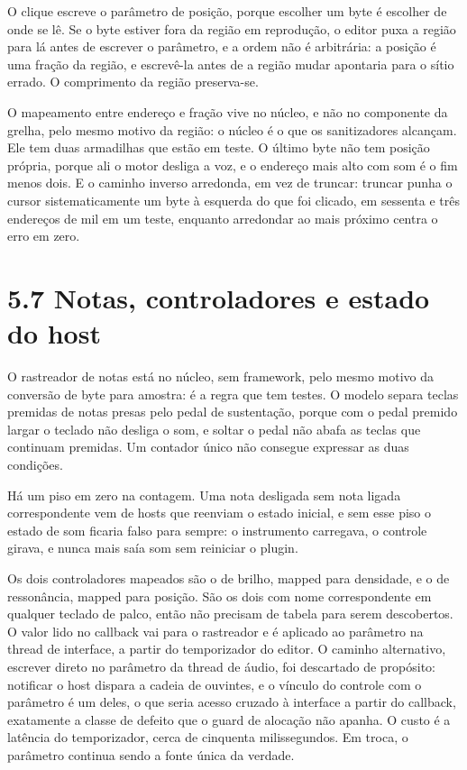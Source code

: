 \documentclass[12pt,a4paper]{article}
\begin{document}
O clique escreve o parâmetro de posição, porque escolher um byte é escolher de onde se lê. Se o byte estiver fora da região em reprodução, o editor puxa a região para lá antes de escrever o parâmetro, e a ordem não é arbitrária: a posição é uma fração da região, e escrevê-la antes de a região mudar apontaria para o sítio errado. O comprimento da região preserva-se.


O mapeamento entre endereço e fração vive no núcleo, e não no componente da grelha, pelo mesmo motivo da região: o núcleo é o que os sanitizadores alcançam. Ele tem duas armadilhas que estão em teste. O último byte não tem posição própria, porque ali o motor desliga a voz, e o endereço mais alto com som é o fim menos dois. E o caminho inverso arredonda, em vez de truncar: truncar punha o cursor sistematicamente um byte à esquerda do que foi clicado, em sessenta e três endereços de mil em um teste, enquanto arredondar ao mais próximo centra o erro em zero.


\section*{5.7 Notas, controladores e estado do host}

O rastreador de notas está no núcleo, sem framework, pelo mesmo motivo da conversão de byte para amostra: é a regra que tem testes. O modelo separa teclas premidas de notas presas pelo pedal de sustentação, porque com o pedal premido largar o teclado não desliga o som, e soltar o pedal não abafa as teclas que continuam premidas. Um contador único não consegue expressar as duas condições.


Há um piso em zero na contagem. Uma nota desligada sem nota ligada correspondente vem de hosts que reenviam o estado inicial, e sem esse piso o estado de som ficaria falso para sempre: o instrumento carregava, o controle girava, e nunca mais saía som sem reiniciar o plugin.


Os dois controladores mapeados são o de brilho, mapped para densidade, e o de ressonância, mapped para posição. São os dois com nome correspondente em qualquer teclado de palco, então não precisam de tabela para serem descobertos. O valor lido no callback vai para o rastreador e é aplicado ao parâmetro na thread de interface, a partir do temporizador do editor. O caminho alternativo, escrever direto no parâmetro da thread de áudio, foi descartado de propósito: notificar o host dispara a cadeia de ouvintes, e o vínculo do controle com o parâmetro é um deles, o que seria acesso cruzado à interface a partir do callback, exatamente a classe de defeito que o guard de alocação não apanha. O custo é a latência do temporizador, cerca de cinquenta milissegundos. Em troca, o parâmetro continua sendo a fonte única da verdade.
\end{document}
